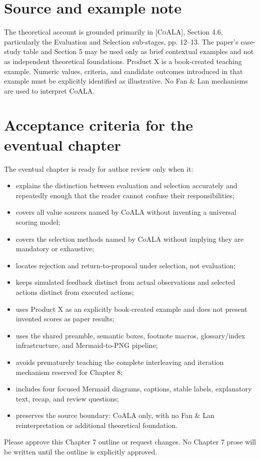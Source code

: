 \section*{Source and example note}
The theoretical account is grounded primarily in \textsc{[CoALA]}, Section 4.6, particularly the Evaluation and Selection sub-stages, pp. 12--13. The paper's case-study table and Section 5 may be used only as brief contextual examples and not as independent theoretical foundations. Product X is a book-created teaching example. Numeric values, criteria, and candidate outcomes introduced in that example must be explicitly identified as illustrative. No Fan \& Lan mechanisms are used to interpret CoALA.

\section*{Acceptance criteria for the eventual chapter}
The eventual chapter is ready for author review only when it:
\begin{itemize}
  \item explains the distinction between evaluation and selection accurately and repeatedly enough that the reader cannot confuse their responsibilities;
  \item covers all value sources named by CoALA without inventing a universal scoring model;
  \item covers the selection methods named by CoALA without implying they are mandatory or exhaustive;
  \item locates rejection and return-to-proposal under selection, not evaluation;
  \item keeps simulated feedback distinct from actual observations and selected actions distinct from executed actions;
  \item uses Product X as an explicitly book-created example and does not present invented scores as paper results;
  \item uses the shared preamble, semantic boxes, footnote macros, glossary/index infrastructure, and Mermaid-to-PNG pipeline;
  \item avoids prematurely teaching the complete interleaving and iteration mechanism reserved for Chapter 8;
  \item includes four focused Mermaid diagrams, captions, stable labels, explanatory text, recap, and review questions;
  \item preserves the source boundary: CoALA only, with no Fan \& Lan reinterpretation or additional theoretical foundation.
\end{itemize}
\begin{takeawaybox}
Please approve this Chapter 7 outline or request changes. No Chapter 7 prose will be written until the outline is explicitly approved.
\end{takeawaybox}

